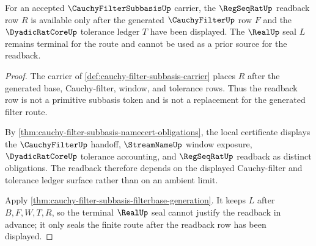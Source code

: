 \begin{theorem}
\label{thm:cauchy-filter-subbasis-regular-readback}
For an accepted $\CauchyFilterSubbasisUp$ carrier, the $\RegSeqRatUp$ readback row $R$ is available only after the generated $\CauchyFilterUp$ row $F$ and the $\DyadicRatCoreUp$ tolerance ledger $T$ have been displayed. The $\RealUp$ seal $L$ remains terminal for the route and cannot be used as a prior source for the readback.
\end{theorem}
\begin{proof}
The carrier of \autoref{def:cauchy-filter-subbasis-carrier} places $R$ after the generated base, Cauchy-filter, window, and tolerance rows. Thus the readback row is not a primitive subbasis token and is not a replacement for the generated filter route.

By \autoref{thm:cauchy-filter-subbasis-namecert-obligations}, the local certificate displays the $\CauchyFilterUp$ handoff, $\StreamNameUp$ window exposure, $\DyadicRatCoreUp$ tolerance accounting, and $\RegSeqRatUp$ readback as distinct obligations. The readback therefore depends on the displayed Cauchy-filter and tolerance ledger surface rather than on an ambient limit.

Apply \autoref{thm:cauchy-filter-subbasis-filterbase-generation}. It keeps $L$ after $B,F,W,T,R$, so the terminal $\RealUp$ seal cannot justify the readback in advance; it only seals the finite route after the readback row has been displayed.
\end{proof}




